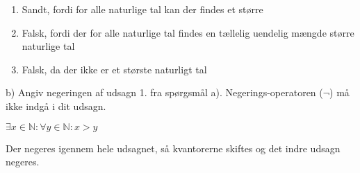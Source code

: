 \documentclass{article}
\begin{document}
\begin{enumerate}
    \item Sandt, fordi for alle naturlige tal kan der findes et større
    \item Falsk, fordi der for alle naturlige tal findes en tællelig uendelig mængde større naturlige tal
    \item Falsk, da der ikke er et største naturligt tal
\end{enumerate}

\noindent b) Angiv negeringen af udsagn 1. fra spørgsmål a). Negerings-operatoren ($\neg$) må ikke indgå i dit udsagn.

$\exists x \in\mathbb{N}: \forall y \in\mathbb{N}: x > y$

\noindent Der negeres igennem hele udsagnet, så kvantorerne skiftes og det indre udsagn negeres.
\end{document}
